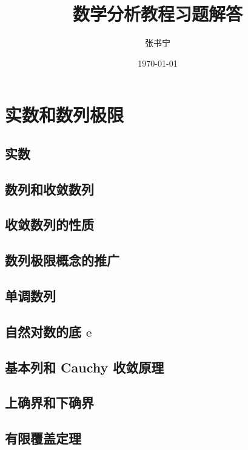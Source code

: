 \documentclass[a4paper, 12pt]{ctexbook}
\title{数学分析教程习题解答}
\author{张书宁}
\date{\today}
\begin{document}
    \maketitle

    \tableofcontents
    \mainmatter

    \chapter{实数和数列极限}
        \section{实数}
        \section{数列和收敛数列}
            
        \section{收敛数列的性质}
            
        \section{数列极限概念的推广}
            
        \section{单调数列}
            
        \section{自然对数的底 $\mathrm{e}$}
            
        \section{基本列和 Cauchy 收敛原理}
            
        \section{上确界和下确界}
            
        \section{有限覆盖定理}
\end{document}

